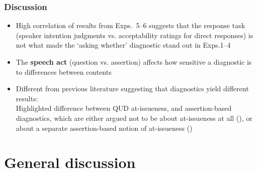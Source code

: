 \documentclass[compress, xcolor = dvipsnames, aspectratio=169, handout]{beamer}
\begin{document}
	\begin{frame}\frametitle{Discussion}
		
		\begin{itemize}[<+->]
			\item High correlation of results from Exps.~5–6 suggests that the response task (speaker intention judgments vs. acceptability ratings for direct responses) is not what made the `asking whether' diagnostic stand out in Exps.1–4

			\item The \textbf{speech act} (question vs. assertion) affects how sensitive a diagnostic is to differences between contents
			\item Different from previous literature suggesting that diagnostics yield different results:\\
			Highlighted difference between QUD at-issueness, and assertion-based diagnostics, which are either argued not to be about at-issueness at all
			(\citealt{snider_anaphoric_2017,snider_at-issueness_2017,snider_distinguishing_2018}), or about a separate assertion-based notion of at-issueness (\citealt{koev_notions_2018,faller_discourse_2019,korotkova_evidential_2020})
		\end{itemize} 

	\end{frame}	

\section{General discussion}
\end{document}
